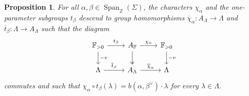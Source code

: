 \documentclass[12pt]{amsart}
\numberwithin{equation}{section}
\newtheorem{proposition}[theorem]{Proposition}
\theoremstyle{remark} %
\begin{document}
\begin{proposition}\label{prop:char_cochar_Lambda}
	For all $\alpha, \beta \in \operatorname{Span}_{
		\mathbb{Z}}(\Sigma)$, the characters $\chi_\alpha$ and the one-parameter subgroups $t_\beta$ descend to group homomorphisms $\overline{\chi}_\alpha \colon A_\Lambda \to \Lambda$ and $\overline{t}_\beta \colon \Lambda \to A_\Lambda$ such that the diagram
	$$
	\begin{tikzcd}
		\mathbb{F}_{>0} \arrow[d, "-v"] \arrow[r, "t_{\beta}"] & A_{\mathbb{F}} \arrow[d,two heads] \arrow[r, "\chi_\alpha"] & \mathbb{F}_{>0} \arrow[d, "-v"]  \\
		\Lambda \arrow[r, "\overline{t}_\beta"]                             & A_\Lambda \arrow[r, "\overline{\chi}_\alpha"]                     & \Lambda                                 
	\end{tikzcd}
	$$
	commutes and such that 
	$
	\chi_\alpha \circ t_\beta (\lambda ) =b( \alpha, \beta^\vee ) \cdot \lambda
	$ for every $\lambda \in \Lambda$.
\end{proposition}
\end{document}
